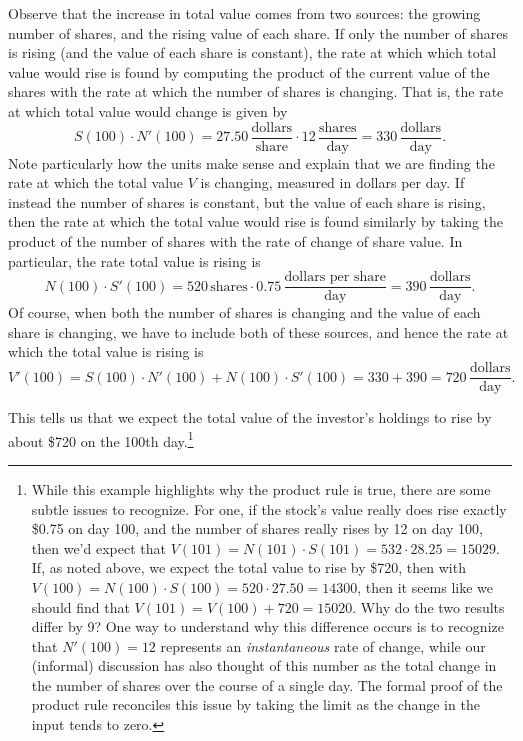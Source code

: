 Observe that the increase in total value comes from two sources: the growing number of shares, and the rising value of each share.  If only the number of shares is rising (and the value of each share is constant), the rate at which which total value would rise is found by computing the product of the current value of the shares with the rate at which the number of shares is changing.  That is, the rate at which total value would change is given by
$$S(100) \cdot N'(100) = 27.50 \, \frac{\mbox{dollars}}{\mbox{share}} \cdot 12 \, \frac{\mbox{shares}}{\mbox{day}} = 330 \, \frac{\mbox{dollars}}{\mbox{day}}.$$ 
Note particularly how the units make sense and explain that we are finding the rate at which the total value $V$ is changing, measured in dollars per day.  If instead the number of shares is constant, but the value of each share is rising, then the rate at which the total value would rise is found similarly by taking the product of the number of shares with the rate of change of share value.  In particular, the rate total value is rising is 
$$N(100) \cdot S'(100) = 520 \, \mbox{shares} \cdot 0.75 \, \frac{\mbox{dollars per share}}{\mbox{day}} = 390 \, \frac{\mbox{dollars}}{\mbox{day}}.$$
Of course, when both the number of shares is changing and the value of each share is changing, we have to include both of these sources, and hence the rate at which the total value is rising is
$$V'(100) = S(100) \cdot N'(100) + N(100) \cdot S'(100) = 330 + 390 = 720 \, \frac{\mbox{dollars}}{\mbox{day}}.$$

This tells us that we expect the total value of the investor's holdings to rise by about \$720 on the 100th day.\footnote{While this example highlights why the product rule is true, there are some subtle issues to recognize.  For one, if the stock's value really does rise exactly \$0.75 on day 100, and the number of shares really rises by 12 on day 100, then we'd expect that $V(101) = N(101) \cdot S(101) = 532 \cdot 28.25 = 15029$.  If, as noted above, we expect the total value to rise by \$720, then with $V(100) = N(100) \cdot S(100) = 520 \cdot 27.50 = 14300$, then it seems like we should find that $V(101) = V(100) + 720 = 15020.$  Why do the two results differ by 9?  One way to understand why this difference occurs is to recognize that $N'(100) = 12$ represents an \emph{instantaneous} rate of change, while our (informal) discussion has also thought of this number as the total change in the number of shares over the course of a single day.  The formal proof of the product rule reconciles this issue by taking the limit as the change in the input tends to zero.}

